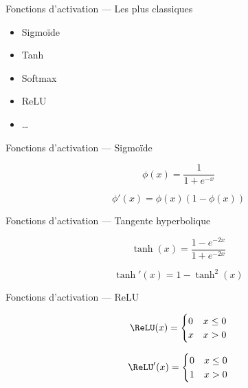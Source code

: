 \begin{frame}{Fonctions d'activation --- Les plus classiques}
  \begin{itemize}
  \item Sigmoïde
  \item Tanh
  \item Softmax
  \item ReLU
  \item …
  \end{itemize}
\end{frame}

\begin{frame}{Fonctions d'activation --- Sigmoïde}
  \begin{center}
  \end{center}

  \begin{description}[<+->]
    \item[Définition] \[\phi(x) = \frac{1}{1 + e^{-x}}\]
    \item[Dérivée] \[\phi'(x)=\phi(x)(1-\phi(x))\]
  \end{description}
\end{frame}

\begin{frame}{Fonctions d'activation --- Tangente hyperbolique}
  \begin{center}
  \end{center}

  \begin{description}[<+->]
    \item[Définition] \[\tanh(x)=\frac{1-e^{-2x}}{1+e^{-2x}}\]
    \item[Dérivée] \[\tanh'(x)=1-\tanh^2(x)\]
  \end{description}
\end{frame}

\begin{frame}{Fonctions d'activation --- ReLU}
  \begin{center}
  \end{center}

  \begin{description}[<+->]
    \item[Définition] \[\ReLU(x)=\begin{cases} 0 & x \leq 0 \\ x & x > 0\end{cases}\]
    \item[Dérivée] \[\ReLU'(x)=\begin{cases} 0 & x \leq 0 \\ 1 & x > 0\end{cases}\]
  \end{description}
\end{frame}

